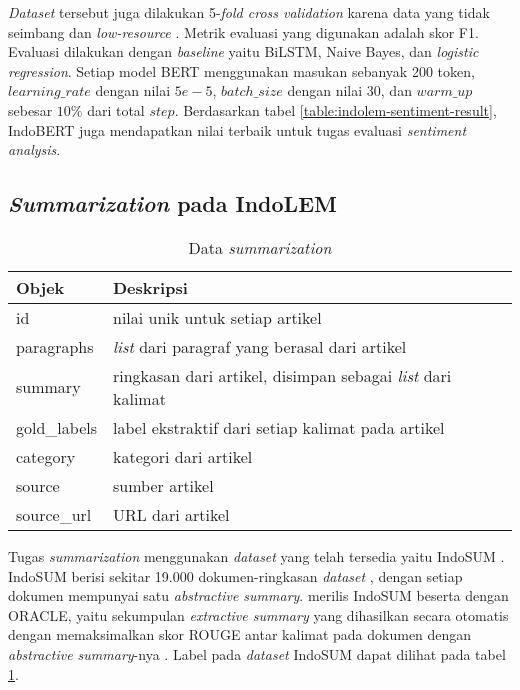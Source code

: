 \textit{Dataset} tersebut juga dilakukan 5-\textit{fold cross validation} karena data yang tidak seimbang dan \textit{low-resource} \parencite{indolem}. Metrik evaluasi yang digunakan adalah skor F1. Evaluasi dilakukan dengan \textit{baseline} yaitu BiLSTM, Naive Bayes, dan \textit{logistic regression}. Setiap model BERT menggunakan masukan sebanyak 200 token, $learning\_rate$ dengan nilai $5e-5$, $batch\_size$ dengan nilai 30, dan $warm\_up$ sebesar $10\%$ dari total $step$. Berdasarkan tabel \ref{table:indolem-sentiment-result}, IndoBERT juga mendapatkan nilai terbaik untuk tugas evaluasi \textit{sentiment analysis}.

\subsection{\textit{Summarization} pada IndoLEM}

\begin{table}[h]
    \caption{Data \textit{summarization}}
    \label{table:label-summarization}
    \begin{center}
        \begin{tabular}{l|l}
            \toprule
            \textbf{Objek} & \textbf{Deskripsi} \\
            \midrule
            id & nilai unik untuk setiap artikel \\
            paragraphs & \textit{list} dari paragraf yang berasal dari artikel \\
            summary & ringkasan dari artikel, disimpan sebagai \textit{list} dari kalimat \\ 
            gold\_labels & label ekstraktif dari setiap kalimat pada artikel \\
            category & kategori dari artikel \\
            source & sumber artikel \\
            source\_url & URL dari artikel \\
            \bottomrule
        \end{tabular}
    \end{center}
\end{table}

Tugas \textit{summarization} menggunakan \textit{dataset} yang telah tersedia yaitu IndoSUM \parencite{summarization}. IndoSUM berisi sekitar 19.000 dokumen-ringkasan \textit{dataset} \parencite{indolem}, dengan setiap dokumen mempunyai satu \textit{abstractive summary}. \citeauthor{summarization} merilis IndoSUM beserta dengan ORACLE, yaitu sekumpulan \textit{extractive summary} yang dihasilkan secara otomatis dengan memaksimalkan skor ROUGE antar kalimat pada dokumen dengan \textit{abstractive summary}-nya \parencite{indolem}. Label pada \textit{dataset} IndoSUM dapat dilihat pada tabel \ref{table:label-summarization}.

